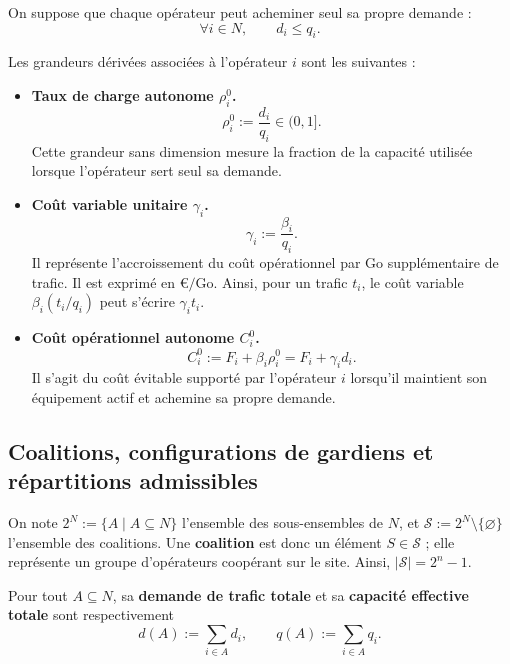 \begin{definition}
On suppose que chaque opérateur peut acheminer seul sa propre demande :
\[
    \forall i\in N,\qquad d_i\leqslant q_i.
\]

Les grandeurs dérivées associées à l'opérateur \(i\) sont les suivantes :
\begin{itemize}
    \item \textbf{Taux de charge autonome \(\rho_i^0\).}
    \[
        \rho_i^0:=\frac{d_i}{q_i}\in(0,1].
    \]
    Cette grandeur sans dimension mesure la fraction de la capacité
    utilisée lorsque l'opérateur sert seul sa demande.

    \item \textbf{Coût variable unitaire \(\gamma_i\).}
    \[
        \gamma_i:=\frac{\beta_i}{q_i}.
    \]
    Il représente l'accroissement du coût opérationnel par \(\mathrm{Go}\)
    supplémentaire de trafic. Il est exprimé en \(\text{€}/\mathrm{Go}\).
    Ainsi, pour un trafic \(t_i\), le coût variable
    \(\beta_i(t_i/q_i)\) peut s'écrire \(\gamma_i t_i\).

    \item \textbf{Coût opérationnel autonome \(C_i^0\).}
    \[
        C_i^0:=F_i+\beta_i\rho_i^0
        =F_i+\gamma_i d_i.
    \]
    Il s'agit du coût évitable supporté par l'opérateur \(i\) lorsqu'il
    maintient son équipement actif et achemine sa propre demande.
\end{itemize}
\end{definition}



\subsection{Coalitions, configurations de gardiens et répartitions admissibles}


\begin{definition}[Coalition]
On note \(2^N:=\{A\mid A\subseteq N\}\) l'ensemble des sous-ensembles de
\(N\), et \(\mathcal S:=2^N\setminus\{\varnothing\}\) l'ensemble des
coalitions. Une \textbf{coalition} est donc un élément \(S\in\mathcal S\) ;
elle représente un groupe d'opérateurs coopérant sur le site. Ainsi,
\(|\mathcal S|=2^n-1\).
\end{definition}

Pour tout $A\subseteq N$, sa \textbf{demande de trafic totale} et sa
\textbf{capacité effective totale} sont respectivement
\[
    d(A):=\sum_{i\in A}d_i,
    \qquad
    q(A):=\sum_{i\in A}q_i.
\]

